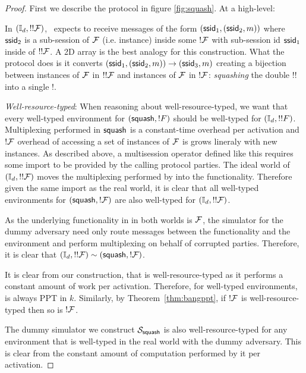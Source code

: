 \begin{proof}
First we describe the  protocol in figure \ref{fig:squash}.
At a high-level:

In $(\mathbb{I}_d, !!\mathcal{F})$, \idealP~expects to receive messages of the form $({\mathsf {ssid}}_1, ({\mathsf {ssid}}_2, m))$ where ${\mathsf {ssid_2}}$ is a sub-session of $\mathcal{F}$ (i.e. instance) inside some $!\mathcal{F}$ with sub-session id ${\mathsf {ssid}}_1$ inside of $!!\mathcal{F}$. A 2D array is the best analogy for this construction.
What the  protocol does is it converts $({\mathsf {ssid}}_1, ({\mathsf {ssid}}_2, m)) \rightarrow ({\mathsf {ssid}}_3, m)$ creating a bijection between instances of $\mathcal{F}$ in $!!\mathcal{F}$ and instances of $\mathcal{F}$ in $!\mathcal{F}$: \textit{squashing} the double $!!$ into a single $!$.

\textit{Well-resource-typed}:
When reasoning about well-resource-typed, we want that every well-typed environment for $({\mathsf {squash}}, !F)$ should be well-typed for $(\mathbb{I}_d, !!F)$.
Multiplexing performed in ${\mathsf {squash}}$ is a constant-time overhead per activation and $!\mathcal{F}$ overhead of accessing a set of instances of $\mathcal{F}$ is grows lineraly with new instances.
As described above, a multisession operator defined like this requires some import to be provided by the calling protocol parties.
The ideal world of $(\mathbb{I}_d, !!\mathcal{F})$ moves the multiplexing performed by  into the functionality. 
Therefore given the same import as the real world, it is clear that all well-typed environments for $({\mathsf {squash}}, !\mathcal{F})$ are also well-typed for $(\mathbb{I}_d, !!\mathcal{F})$.

As the underlying functionality in in both worlds is $\mathcal{F}$, the  simulator for the dummy adversary need only route messages between the functionality and the environment and perform multiplexing on behalf of corrupted parties.
Therefore, it is clear that $(\mathbb{I}_d, !!\mathcal{F}) \sim ({\mathsf {squash}}, !\mathcal{F})$.

It is clear from our construction, that  is well-resource-typed as it performs a constant amount of work per activation.
Therefore, for well-typed environments,  is always PPT in $k$.
Similarly, by Theorem~\ref{thm:bangppt}, if $!\mathcal{F}$ is well-resource-typed then so is $!\mathcal{F}$.

The dummy simulator we construct $\mathcal{S}_{{\mathsf {squash}}}$ is also well-resource-typed for any environment that is well-typed in the real world with the dummy adversary. 
This is clear from the constant amount of computation performed by it per activation.


\end{proof}
